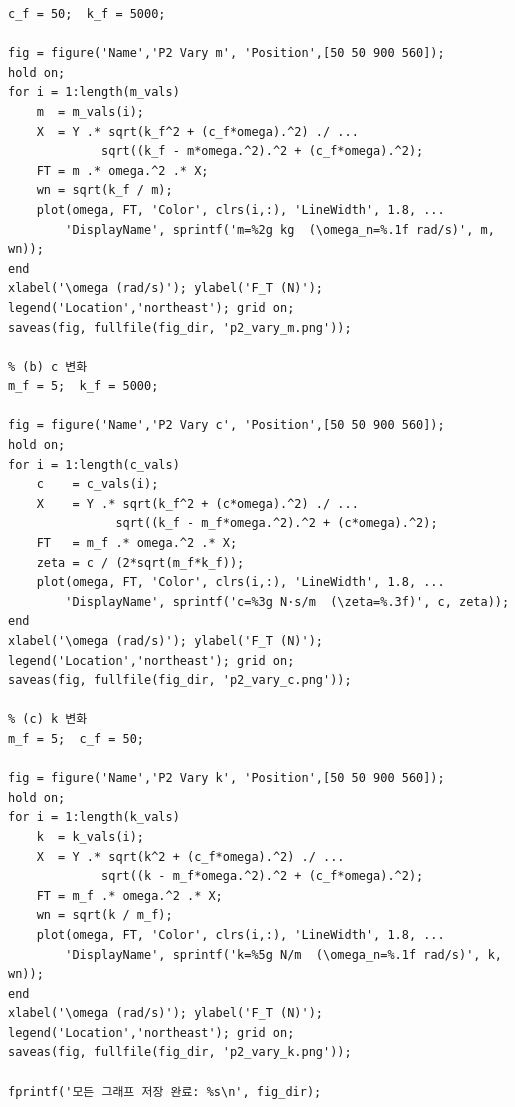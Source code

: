 \documentclass[12pt, a4paper]{article}
\begin{document}
\begin{lstlisting}[caption={solve.m — 문제 2: 바닥 가진}]
% (a) m 변화
c_f = 50;  k_f = 5000;

fig = figure('Name','P2 Vary m', 'Position',[50 50 900 560]);
hold on;
for i = 1:length(m_vals)
    m  = m_vals(i);
    X  = Y .* sqrt(k_f^2 + (c_f*omega).^2) ./ ...
             sqrt((k_f - m*omega.^2).^2 + (c_f*omega).^2);
    FT = m .* omega.^2 .* X;
    wn = sqrt(k_f / m);
    plot(omega, FT, 'Color', clrs(i,:), 'LineWidth', 1.8, ...
        'DisplayName', sprintf('m=%2g kg  (\omega_n=%.1f rad/s)', m, wn));
end
xlabel('\omega (rad/s)'); ylabel('F_T (N)');
legend('Location','northeast'); grid on;
saveas(fig, fullfile(fig_dir, 'p2_vary_m.png'));

% (b) c 변화
m_f = 5;  k_f = 5000;

fig = figure('Name','P2 Vary c', 'Position',[50 50 900 560]);
hold on;
for i = 1:length(c_vals)
    c    = c_vals(i);
    X    = Y .* sqrt(k_f^2 + (c*omega).^2) ./ ...
               sqrt((k_f - m_f*omega.^2).^2 + (c*omega).^2);
    FT   = m_f .* omega.^2 .* X;
    zeta = c / (2*sqrt(m_f*k_f));
    plot(omega, FT, 'Color', clrs(i,:), 'LineWidth', 1.8, ...
        'DisplayName', sprintf('c=%3g N·s/m  (\zeta=%.3f)', c, zeta));
end
xlabel('\omega (rad/s)'); ylabel('F_T (N)');
legend('Location','northeast'); grid on;
saveas(fig, fullfile(fig_dir, 'p2_vary_c.png'));

% (c) k 변화
m_f = 5;  c_f = 50;

fig = figure('Name','P2 Vary k', 'Position',[50 50 900 560]);
hold on;
for i = 1:length(k_vals)
    k  = k_vals(i);
    X  = Y .* sqrt(k^2 + (c_f*omega).^2) ./ ...
             sqrt((k - m_f*omega.^2).^2 + (c_f*omega).^2);
    FT = m_f .* omega.^2 .* X;
    wn = sqrt(k / m_f);
    plot(omega, FT, 'Color', clrs(i,:), 'LineWidth', 1.8, ...
        'DisplayName', sprintf('k=%5g N/m  (\omega_n=%.1f rad/s)', k, wn));
end
xlabel('\omega (rad/s)'); ylabel('F_T (N)');
legend('Location','northeast'); grid on;
saveas(fig, fullfile(fig_dir, 'p2_vary_k.png'));

fprintf('모든 그래프 저장 완료: %s\n', fig_dir);
\end{lstlisting}
\end{document}
